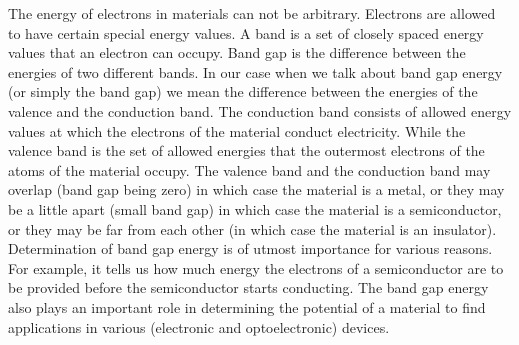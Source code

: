\documentclass{article}
\begin{document}
The energy of electrons in materials can not be arbitrary. Electrons are allowed to have certain special energy values. A band is a set of closely spaced energy values that an electron can occupy. Band gap is the difference between the energies of two different bands. In our case when we talk about band gap energy (or simply the band gap) we mean the difference between the energies of the valence and the conduction band. The conduction band consists of allowed energy values at which the electrons of the material conduct electricity. While the valence band is the set of allowed energies that the outermost electrons of the atoms of the material occupy. The valence band and the conduction band may overlap (band gap being zero) in which case the material is a metal, or they may be a little apart (small band gap) in which case the material is a semiconductor, or they may be far from each other (in which case the material is an insulator). Determination of band gap energy is of utmost importance for various reasons. For example, it tells us how much energy the electrons of a semiconductor are to be provided before the semiconductor starts conducting. The band gap energy also plays an important role in determining the potential of a material to find applications in various (electronic and optoelectronic) devices. \par
\end{document}
